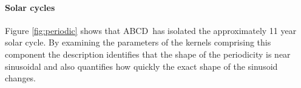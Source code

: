 \documentclass[letterpaper]{article}
\newcommand{\procedurename}{ABCD\ }
\begin{document}



\paragraph{Solar cycles}

Figure \ref{fig:periodic} shows that \procedurename has isolated the approximately 11 year solar cycle.
By examining the parameters of the kernels comprising this component the description identifies that the shape of the periodicity is near sinusoidal and also quantifies how quickly the exact shape of the sinusoid changes.

%

\end{document}
